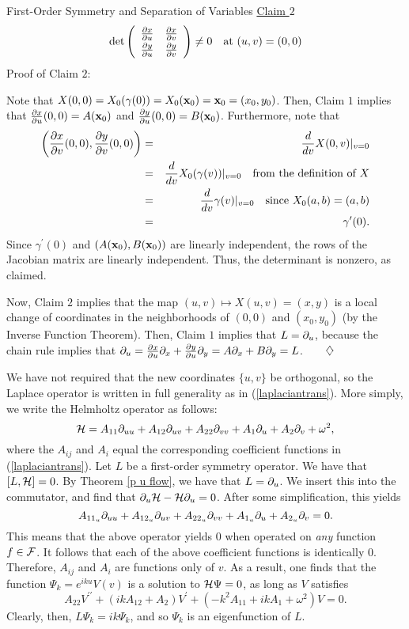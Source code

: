 \begin{section}{First-Order Symmetry and Separation of Variables}
\noindent \underline{Claim $2$}
\[
\det \left( \begin{array}{cc}
\frac{\partial x}{\partial u} & \frac{\partial x}{\partial v} \\ [2pt]
\frac{\partial y}{\partial u} & \frac{\partial y}{\partial v} \end{array} \right) \not= 0
\quad
\mbox{at $(u,v) = (0,0)$}
\]
\noindent Proof of Claim $2$:

\noindent Note that $X(0,0) = X_0(\gamma(0)) = X_0(\mathbf{x}_0) = \mathbf{x}_0 = (x_0,y_0)$.  Then, Claim $1$ implies that $\frac{\partial x}{\partial u}(0,0) = A(\mathbf{x}_0)$ and $\frac{\partial y}{\partial u}(0,0) = B(\mathbf{x}_0)$.  Furthermore, note that
\begin{eqnarray*}
\left( \frac{\partial x}{\partial v}(0,0),\frac{\partial y}{\partial v}(0,0) \right) & = & \frac{d}{d v} X(0,v) |_{v=0} \\
 & = & \frac{d}{d v} X_0(\gamma(v)) |_{v=0} \quad \mbox{from the definition of $X$} \\
 & = & \frac{d}{d v} \gamma(v) |_{v=0} \quad \mbox{since $X_0(a,b) = (a,b)$} \\
 & = & \gamma^\prime(0).
\end{eqnarray*}
Since $\gamma^\prime(0)$ and $(A(\mathbf{x}_0),B(\mathbf{x}_0))$ are linearly independent, the rows of the Jacobian matrix are linearly independent.  Thus, the determinant is nonzero, as claimed.

Now, Claim $2$ implies that the map $(u,v) \mapsto X(u,v) = (x,y)$ is a local change of coordinates in the neighborhoods of $(0,0)$ and $(x_0,y_0)$ (by the Inverse Function Theorem).  Then, Claim $1$ implies that $L = \partial_{u}$, because the chain rule implies that $\partial_{u} = \frac{\partial x}{\partial u}\partial_{x} + \frac{\partial y}{\partial u}\partial_{y} = A\partial_{x} + B\partial_{y} = L$.$\qquad \diamondsuit$

\eex

We have not required that the new coordinates $\{ u,v \}$ be orthogonal, so the Laplace operator is written in full generality as in (\ref{laplaciantrans}).  More simply, we write the Helmholtz operator as follows:
\begin{equation}
\label{helmgentrans}
\mathcal{H} = A_{11} \partial_{u u} + A_{12} \partial_{u v} + A_{22} \partial_{v v} + A_1 \partial_{u} + A_2 \partial_{v} + \omega^2,
\end{equation}
where the $A_{ij}$ and $A_i$ equal the corresponding coefficient functions in (\ref{laplaciantrans}).  Let $L$ be a first-order symmetry operator.  We have that $[L,\mathcal{H}] = 0$.  By Theorem \ref{p u flow}, we have that $L = \partial_{u}$.  We insert this into the commutator, and find that $\partial_{u} \mathcal{H} - \mathcal{H} \partial_{u} = 0$.  After some simplification, this yields
\[
A_{{11}_u}\partial_{u u} + A_{{12}_u}\partial_{u v} + A_{{22}_u}\partial_{v v} + A_{1_u}\partial_{u} + A_{2_u}\partial_{v} = 0.
\]
This means that the above operator yields $0$ when operated on \emph{any} function $f \in \mathcal{F}$.  It follows that each of the above coefficient functions is identically $0$.  Therefore, $A_{ij}$ and $A_i$ are functions only of $v$.  As a result, one finds that the function $\Psi_k = e^{iku}V(v)$ is a solution to $\mathcal{H} \Psi = 0$, as long as $V$ satisfies
\[
A_{22}V^{\prime\prime} + \left( ikA_{12} + A_2 \right) V^\prime + \left( -k^2 A_{11} + ik A_1 + \omega^2 \right) V = 0.
\]
Clearly, then, $L \Psi_k = ik \Psi_k$, and so $\Psi_k$ is an eigenfunction of $L$.


\end{section}
